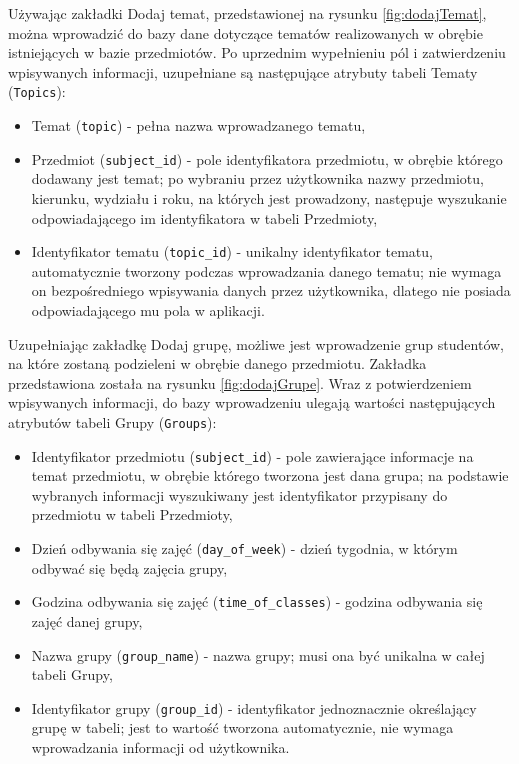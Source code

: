 Używając zakładki Dodaj temat, przedstawionej na rysunku \ref{fig:dodajTemat}, można wprowadzić do bazy dane dotyczące tematów realizowanych w obrębie istniejących w bazie przedmiotów. Po uprzednim wypełnieniu pól i zatwierdzeniu wpisywanych informacji, uzupełniane są następujące atrybuty tabeli Tematy (\verb!Topics!):
\begin{itemize}
\item Temat (\verb!topic!) - pełna nazwa wprowadzanego tematu,
\item Przedmiot (\verb!subject_id!) - pole identyfikatora przedmiotu, w obrębie którego dodawany jest temat; po wybraniu przez użytkownika nazwy przedmiotu, kierunku, wydziału i roku, na których jest prowadzony, następuje wyszukanie odpowiadającego im identyfikatora w tabeli Przedmioty,
\item Identyfikator tematu (\verb!topic_id!) - unikalny identyfikator tematu, automatycznie tworzony podczas wprowadzania danego tematu; nie wymaga on bezpośredniego wpisywania danych przez użytkownika, dlatego nie posiada odpowiadającego mu pola w aplikacji.
\end{itemize}

Uzupełniając zakładkę Dodaj grupę, możliwe jest wprowadzenie grup studentów, na które zostaną podzieleni w obrębie danego przedmiotu. Zakładka przedstawiona została na rysunku \ref{fig:dodajGrupe}. Wraz z potwierdzeniem wpisywanych informacji, do bazy wprowadzeniu ulegają wartości następujących atrybutów tabeli Grupy (\verb!Groups!):
\begin{itemize}
\item Identyfikator przedmiotu (\verb!subject_id!) - pole zawierające informacje na temat przedmiotu, w obrębie którego tworzona jest dana grupa; na podstawie wybranych informacji wyszukiwany jest identyfikator przypisany do przedmiotu w tabeli Przedmioty,
\item Dzień odbywania się zajęć (\verb!day_of_week!) - dzień tygodnia, w którym odbywać się będą zajęcia grupy,
\item Godzina odbywania się zajęć (\verb!time_of_classes!) - godzina odbywania się zajęć danej grupy,
\item Nazwa grupy (\verb!group_name!) - nazwa grupy; musi ona być unikalna w całej tabeli Grupy,
\item Identyfikator grupy (\verb!group_id!) - identyfikator jednoznacznie określający grupę w tabeli; jest to wartość tworzona automatycznie, nie wymaga wprowadzania informacji od użytkownika.
\end{itemize}

